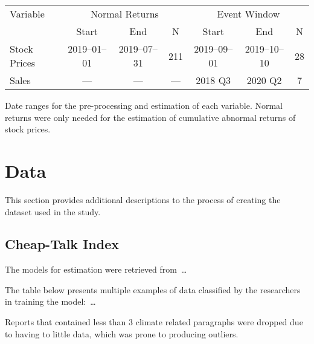 \documentclass[12pt]{article}
\begin{document}
\begin{table}
    \label{tab:data_freq}
    \begin{tabular}{l| c c c| c c c}
        \toprule
        Variable     & \multicolumn{3}{c|}{Normal Returns} & \multicolumn{3}{c}{Event Window} \\
                     & Start & End          & N                 &   Start & End     &     N \\ 
        \midrule
        Stock Prices & 2019--01--01 & 2019--07--31 & 211 & 2019--09--01 & 2019--10--10 & 28\\
        Sales        & ---           &     ---     & --- & 2018 Q3 & 2020 Q2 & 7\\  
        \bottomrule
    \end{tabular}

    \vspace{0.2cm}

    \begin{tablenotes}
        \footnotesize
        \item Date ranges for the pre-processing and estimation of each variable. Normal returns were only needed for the estimation of cumulative abnormal returns of stock prices.
    \end{tablenotes}
\end{table}


\newpage

\normalsize
\raggedright{}
\setcounter{table}{0}
\setcounter{figure}{0}


\section{Data}\label{app:data}

This section provides additional descriptions to the process of creating the dataset used in the study.

\subsection{Cheap-Talk Index}\label{app:data:cti}

The models for estimation were retrieved from\ \dots

The table below presents multiple examples of data classified by the researchers in training the model:\ \dots 

Reports that contained less than 3 climate related paragraphs were dropped due to having to little data, which was prone to producing outliers.
\end{document}
